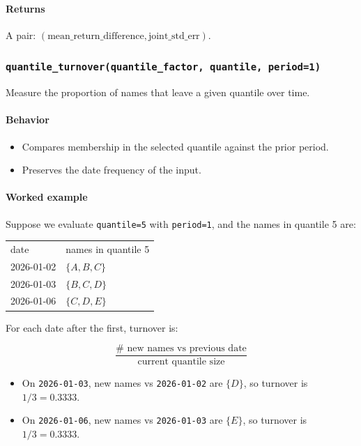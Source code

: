 \documentclass[11pt]{article}
\begin{document}
\paragraph{Returns}
A pair: \((\text{mean\_return\_difference}, \text{joint\_std\_err})\).

\subsubsection{\texttt{quantile\_turnover(quantile\_factor, quantile, period=1)}}
Measure the proportion of names that leave a given quantile over time.

\paragraph{Behavior}
\begin{itemize}
  \item Compares membership in the selected quantile against the prior period.
  \item Preserves the date frequency of the input.
\end{itemize}

\paragraph{Worked example}
Suppose we evaluate \texttt{quantile=5} with \texttt{period=1}, and the names in quantile 5 are:

\begin{center}
\begin{tabular}{ll}
date & names in quantile 5 \\
2026-01-02 & \(\{A, B, C\}\) \\
2026-01-03 & \(\{B, C, D\}\) \\
2026-01-06 & \(\{C, D, E\}\) \\
\end{tabular}
\end{center}

For each date after the first, turnover is:

\[
\frac{\#\text{ new names vs previous date}}{\text{current quantile size}}
\]

\begin{itemize}
  \item On \texttt{2026-01-03}, new names vs \texttt{2026-01-02} are \(\{D\}\), so turnover is \(1 / 3 = 0.3333\).
  \item On \texttt{2026-01-06}, new names vs \texttt{2026-01-03} are \(\{E\}\), so turnover is \(1 / 3 = 0.3333\).
\end{itemize}
\end{document}
